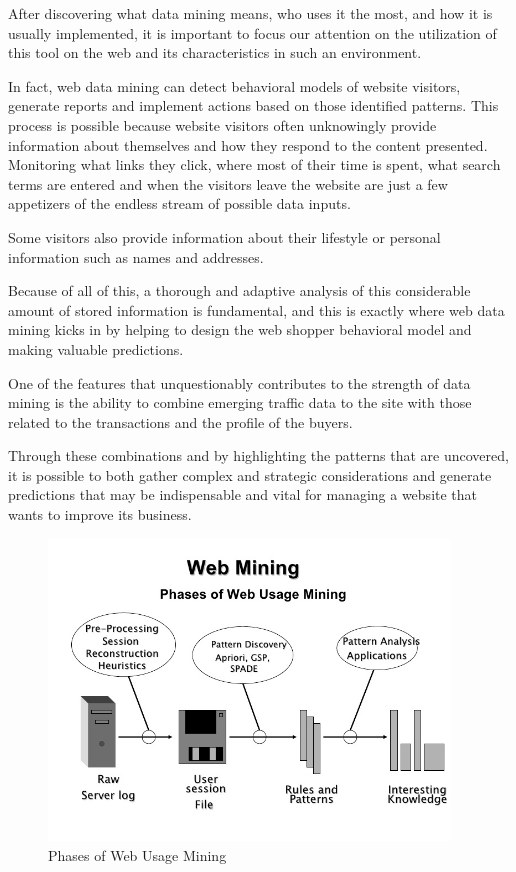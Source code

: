 After discovering what data mining means, who uses it the most, and how it is usually implemented, it is important to focus our attention on the utilization of this tool on the web and its characteristics in such an environment.

In fact, web data mining can detect behavioral models of website visitors, generate reports and implement actions based on those identified patterns.
This process is possible because website visitors often unknowingly provide information about themselves and how they respond to the content presented. Monitoring what links they click, where most of their time is spent, what search terms are entered and when the visitors leave the website are just a few appetizers of the endless stream of possible data inputs.

Some visitors also provide information about their lifestyle or personal information such as names and addresses.

Because of all of this, a thorough and adaptive analysis of this considerable amount of stored information is fundamental, and this is exactly where web data mining kicks in by helping to design the web shopper behavioral model and making valuable predictions.

One of the features that unquestionably contributes to the strength of data mining is the ability to combine emerging traffic data to the site with those related to the transactions and the profile of the buyers.

Through these combinations and by highlighting the patterns that are uncovered, it is possible to both gather complex and strategic considerations and generate predictions that may be indispensable and vital for managing a website that wants to improve its business.

\vspace{0.5cm}
\begin{figure}[!htbp]
  \centering
    \includegraphics[height=8cm]{images/webmining}
  \caption{Phases of Web Usage Mining}
  \label{fig:webmining}
\end{figure}
\vspace{0.5cm}

